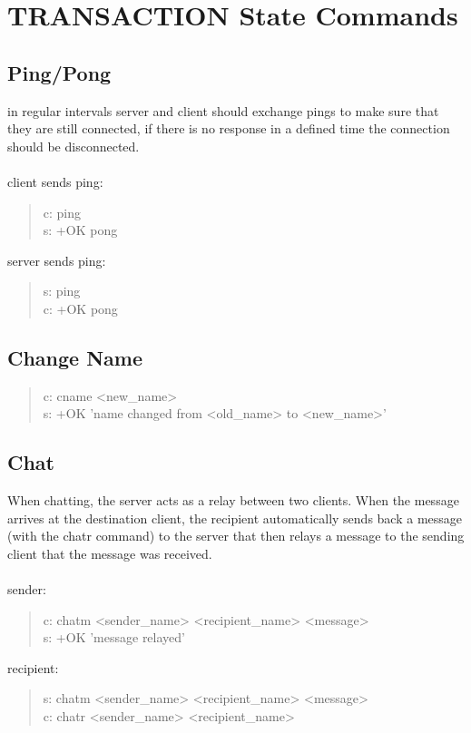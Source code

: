 \documentclass[a4paper,11pt]{article}
\begin{document}
\section{TRANSACTION State Commands}
\subsection{Ping/Pong}
in regular intervals server and client should exchange pings to make sure that they are still connected, if there is no response in a defined time the connection should be disconnected.\\\\
client sends ping:
\begin{quote}
  c: ping\\
  s: +OK pong
\end{quote}
\noindent
server sends ping:
\begin{quote}
  s: ping\\
  c: +OK pong
\end{quote}


\subsection{Change Name}

\begin{quote}
  c: cname <new\_name>\\
  s: +OK 'name changed from <old\_name> to <new\_name>'
\end{quote}


\subsection{Chat}
When chatting, the server acts as a relay between two clients. When the message arrives at the destination client, the recipient automatically sends back a message (with the chatr command) to the server that then relays a message to the sending client that the message was received.\\\\
sender:
\begin{quote}
  c: chatm <sender\_name> <recipient\_name> <message>\\ %
  s: +OK 'message relayed'
\end{quote}
\noindent
recipient:
\begin{quote}
    s: chatm <sender\_name> <recipient\_name> <message>\\
  c: chatr <sender\_name> <recipient\_name>%
\end{quote}
\clearpage
\end{document}
